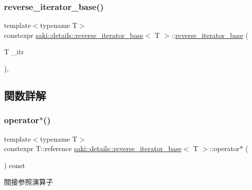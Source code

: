 \subsubsection{\texorpdfstring{reverse\+\_\+iterator\+\_\+base()}{reverse\_iterator\_base()}}
{\footnotesize\ttfamily template$<$typename T$>$ \\
constexpr \mbox{\hyperlink{classsaki_1_1details_1_1reverse__iterator__base}{saki\+::details\+::reverse\+\_\+iterator\+\_\+base}}$<$ T $>$\+::\mbox{\hyperlink{classsaki_1_1details_1_1reverse__iterator__base}{reverse\+\_\+iterator\+\_\+base}} (\begin{DoxyParamCaption}\item[{T}]{\+\_\+itr }\end{DoxyParamCaption})\hspace{0.3cm}{\ttfamily [inline]}, {\ttfamily [explicit]}}



\subsection{関数詳解}
\mbox{\label{classsaki_1_1details_1_1reverse__iterator__base_a7f5228433a205d730e987452ff6e8800}} 
\subsubsection{\texorpdfstring{operator$\ast$()}{operator*()}}
{\footnotesize\ttfamily template$<$typename T$>$ \\
constexpr T\+::reference \mbox{\hyperlink{classsaki_1_1details_1_1reverse__iterator__base}{saki\+::details\+::reverse\+\_\+iterator\+\_\+base}}$<$ T $>$\+::operator$\ast$ (\begin{DoxyParamCaption}{ }\end{DoxyParamCaption}) const\hspace{0.3cm}{\ttfamily [inline]}}



間接参照演算子 

\mbox{\label{classsaki_1_1details_1_1reverse__iterator__base_a6e8e3c069dea1df9a848c95ffe60acbb}} 
